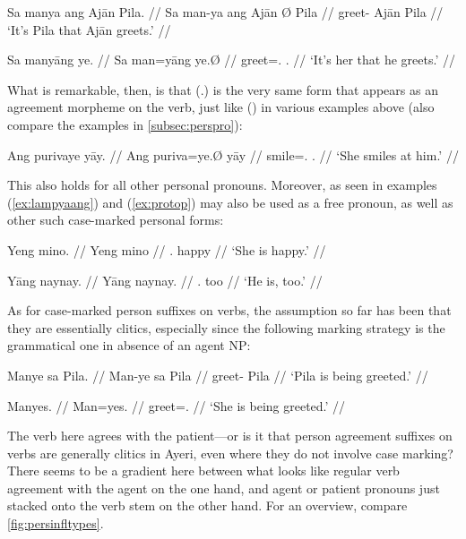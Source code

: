 \pex %
\a\label{ex:fullsntc}\begingl
	\gla Sa manya ang Ajān {} Pila. //
	\glb Sa man-ya ang ​Ajān Ø ​Pila //
	\glc \PatT{} greet-\TsgM{} \Aarg{} ​Ajān \Top{} ​Pila //
	\glft `It's Pila that Ajān greets.' //
\endgl

\a\label{ex:protop}\begingl
	\gla Sa manyāng ye. //
	\glb Sa man=yāng ye.Ø //
	\glc \PatT{} greet=\TsgM{}.\Aarg{} \TsgF{}.\Top{} //
	\glft `It's her that he greets.' //
\endgl

\xe

What is remarkable, then, is that  (\TsgF{}.\Top{}) is the very 
same form that appears as an agreement morpheme on the verb, just like 
 (\TsgM{}) in various examples above (also compare the examples 
in \autoref{subsec:perspro}):

\ex %
\begingl
	\gla Ang purivaye yāy. //
	\glb Ang puriva=ye.Ø yāy //
	\glc \AgtT{} smile=\TsgF{}.\Top{} \TsgM{}.\Loc{} //
	\glft `She smiles at him.' //
\endgl\xe

This also holds for all other personal pronouns. Moreover, 
 as seen in examples (\ref{ex:lampyaang}) and 
(\ref{ex:protop}) may also be used as a free pronoun, as well as other such 
case-marked personal forms:

\pex %
\a\begingl
	\gla Yeng mino. //
	\glb Yeng mino //
	\glc \TsgF{}.\Aarg{} happy //
	\glft `She is happy.' //
\endgl
	
\a\begingl
	\gla Yāng naynay. //
	\glb Yāng naynay. //
	\glc \TsgM{}.\Aarg{} too //
	\glft `He is, too.' //
\endgl

\xe

As for case-marked person suffixes on verbs, the assumption so far has been 
that they are essentially clitics, especially since the following marking 
strategy is the grammatical one in absence of an agent NP:

\pex\label{ex:passive} %
\a\label{ex:manye}\begingl
	\gla Manye sa Pila. //
	\glb Man-ye sa ​Pila //
	\glc greet-\TsgF{} \Parg{} ​Pila //
	\glft `Pila is being greeted.' //
\endgl
	
\a\label{ex:manyes}\begingl
	\gla Manyes. //
	\glb Man=yes. //
	\glc greet=\TsgF{}.\Parg{} //
	\glft `She is being greeted.' //
\endgl

\xe

The verb here agrees with the patient---or is it that person agreement 
suffixes on verbs are generally clitics in Ayeri, even where they do not
involve case marking? There seems to be a gradient here between what looks 
like regular verb agreement with the agent on the one hand, and agent or 
patient pronouns just stacked onto the verb stem on the other hand. For an 
overview, compare \autoref{fig:persinfltypes}.

